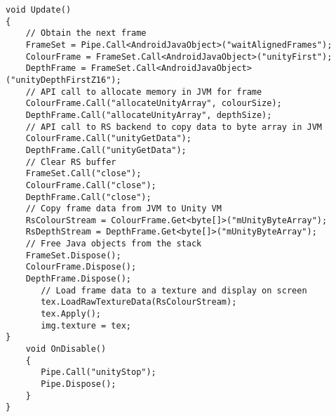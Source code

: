 \begin{lstlisting}[style=CSharpStyle]
void Update()
{
    // Obtain the next frame
    FrameSet = Pipe.Call<AndroidJavaObject>("waitAlignedFrames");
    ColourFrame = FrameSet.Call<AndroidJavaObject>("unityFirst");
    DepthFrame = FrameSet.Call<AndroidJavaObject>("unityDepthFirstZ16");
    // API call to allocate memory in JVM for frame
    ColourFrame.Call("allocateUnityArray", colourSize);
    DepthFrame.Call("allocateUnityArray", depthSize);
    // API call to RS backend to copy data to byte array in JVM
    ColourFrame.Call("unityGetData");
    DepthFrame.Call("unityGetData");
    // Clear RS buffer
    FrameSet.Call("close");
    ColourFrame.Call("close");
    DepthFrame.Call("close");
    // Copy frame data from JVM to Unity VM
    RsColourStream = ColourFrame.Get<byte[]>("mUnityByteArray");
    RsDepthStream = DepthFrame.Get<byte[]>("mUnityByteArray");
    // Free Java objects from the stack
    FrameSet.Dispose();
    ColourFrame.Dispose();
    DepthFrame.Dispose();
       // Load frame data to a texture and display on screen
       tex.LoadRawTextureData(RsColourStream);
       tex.Apply();
       img.texture = tex;
}
    void OnDisable()
    {
       Pipe.Call("unityStop");
       Pipe.Dispose();
    }
}\end{lstlisting}    
